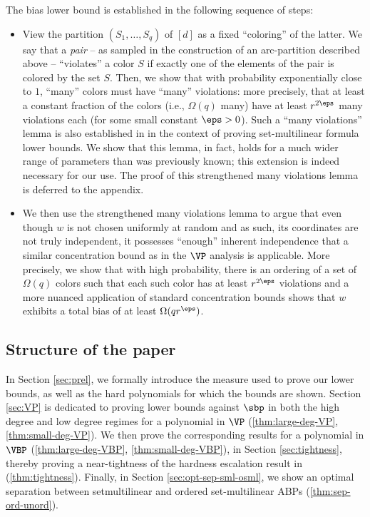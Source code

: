 \documentclass{article}
\begin{document}
The bias lower bound is established in the following sequence of steps:
\begin{itemize}
    \item View the partition $(S_1,\ldots,S_q)$ of $[d]$ as a fixed ``coloring'' of the latter. We say that a \emph{pair} -- as sampled in the construction of an arc-partition described above -- ``violates'' a color $S$ if exactly one of the elements of the pair is colored by the set $S$. Then, we show that with probability exponentially close to $1$, ``many'' colors must have ``many'' violations: more precisely, that at least a constant fraction of the colors (i.e., $\Omega(q)$ many) have at least $r^{2\eps}$ many violations each (for some small constant $\eps>0$). Such a ``many violations'' lemma is also established in \cite{KushS23} in the context of proving set-multilinear formula lower bounds. We show that this lemma, in fact, holds for a much wider range of parameters than was previously known; this extension is indeed necessary for our use. The proof of this strengthened many violations lemma is deferred to the appendix.
    \item We then use the strengthened many violations lemma to argue that even though $w$ is not chosen uniformly at random and as such, its coordinates are not truly independent, it possesses ``enough'' inherent independence  that a similar concentration bound as in the $\VP$ analysis is applicable. More precisely, we show that with high probability, there is an ordering of a set of $\Omega(q)$ colors such that each such color has at least $r^{2\eps}$ violations and a more nuanced application of standard concentration bounds shows that $w$ exhibits a total bias of at least $\Omega(qr^\eps )$.
\end{itemize}

\subsection{Structure of the paper}
In Section \ref{sec:prel}, we formally introduce the measure used to prove our lower bounds, as well as the hard polynomials for which the bounds are shown.
Section \ref{sec:VP} is dedicated to proving lower bounds against $\sbp$ in both the high degree and low degree regimes for a polynomial in $\VP$ (\autoref{thm:large-deg-VP}, \autoref{thm:small-deg-VP}).
We then prove the corresponding results for a polynomial in $\VBP$ (\autoref{thm:large-deg-VBP}, \autoref{thm:small-deg-VBP}), in Section \ref{sec:tightness}, thereby proving a near-tightness of the hardness escalation result in \cite{BDS23} (\autoref{thm:tightness}).
Finally, in Section \ref{sec:opt-sep-sml-osml}, we show an optimal separation between setmultilinear and ordered set-multilinear ABPs (\autoref{thm:sep-ord-unord}).
\end{document}
